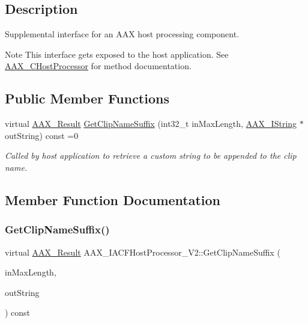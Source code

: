 \subsection{Description}
Supplemental interface for an A\+AX host processing component. 

\begin{DoxyNote}{Note}
This interface gets exposed to the host application. See \mbox{\hyperlink{a01485}{A\+A\+X\+\_\+\+C\+Host\+Processor}} for method documentation. 
\end{DoxyNote}
\subsection*{Public Member Functions}
\begin{DoxyCompactItemize}
\item 
virtual \mbox{\hyperlink{a00392_a4d8f69a697df7f70c3a8e9b8ee130d2f}{A\+A\+X\+\_\+\+Result}} \mbox{\hyperlink{a01697_a60a29fda8490f240ecf869ff14fabf0e}{Get\+Clip\+Name\+Suffix}} (int32\+\_\+t in\+Max\+Length, \mbox{\hyperlink{a01873}{A\+A\+X\+\_\+\+I\+String}} $\ast$out\+String) const =0
\begin{DoxyCompactList}\small\item\em Called by host application to retrieve a custom string to be appended to the clip name. \end{DoxyCompactList}\end{DoxyCompactItemize}


\subsection{Member Function Documentation}
\mbox{\label{a01697_a60a29fda8490f240ecf869ff14fabf0e}} 
\subsubsection{\texorpdfstring{GetClipNameSuffix()}{GetClipNameSuffix()}}
{\footnotesize\ttfamily virtual \mbox{\hyperlink{a00392_a4d8f69a697df7f70c3a8e9b8ee130d2f}{A\+A\+X\+\_\+\+Result}} A\+A\+X\+\_\+\+I\+A\+C\+F\+Host\+Processor\+\_\+\+V2\+::\+Get\+Clip\+Name\+Suffix (\begin{DoxyParamCaption}\item[{int32\+\_\+t}]{in\+Max\+Length,  }\item[{\mbox{\hyperlink{a01873}{A\+A\+X\+\_\+\+I\+String}} $\ast$}]{out\+String }\end{DoxyParamCaption}) const\hspace{0.3cm}{\ttfamily [pure virtual]}}



